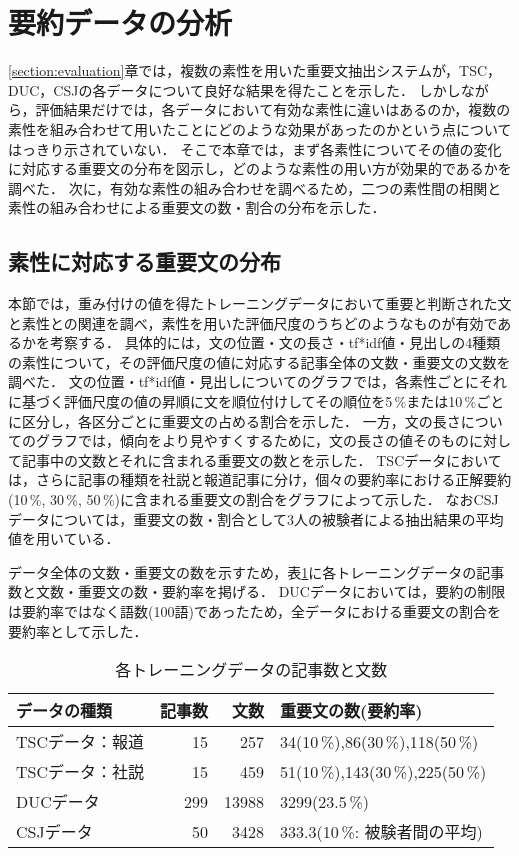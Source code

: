 \section{要約データの分析}
\label{section:analysis}

\ref{section:evaluation}章では，複数の素性を用いた重要文抽出システムが，TSC，DUC，CSJの各データについて良好な結果を得たことを示した．
しかしながら，評価結果だけでは，各データにおいて有効な素性に違いはあるのか，複数の素性を組み合わせて用いたことにどのような効果があったのかという点についてはっきり示されていない．
そこで本章では，まず各素性についてその値の変化に対応する重要文の分布を図示し，どのような素性の用い方が効果的であるかを調べた．
次に，有効な素性の組み合わせを調べるため，二つの素性間の相関と素性の組み合わせによる重要文の数・割合の分布を示した．

\subsection{素性に対応する重要文の分布}

本節では，重み付けの値を得たトレーニングデータにおいて重要と判断された文と素性との関連を調べ，素性を用いた評価尺度のうちどのようなものが有効であるかを考察する．
具体的には，文の位置・文の長さ・tf*idf値・見出しの4種類の素性について，その評価尺度の値に対応する記事全体の文数・重要文の文数を調べた．
文の位置・tf*idf値・見出しについてのグラフでは，各素性ごとにそれに基づく評価尺度の値の昇順に文を順位付けしてその順位を5\,\%または10\,\%ごとに区分し，各区分ごとに重要文の占める割合を示した．
一方，文の長さについてのグラフでは，傾向をより見やすくするために，文の長さの値そのものに対して記事中の文数とそれに含まれる重要文の数とを示した．
TSCデータにおいては，さらに記事の種類を社説と報道記事に分け，個々の要約率における正解要約(10\,\%, 30\,\%, 50\,\%)に含まれる重要文の割合をグラフによって示した．
なおCSJデータについては，重要文の数・割合として3人の被験者による抽出結果の平均値を用いている．

データ全体の文数・重要文の数を示すため，表\ref{table:training_num_of_sent}に各トレーニングデータの記事数と文数・重要文の数・要約率を掲げる．
DUCデータにおいては，要約の制限は要約率ではなく語数(100語)であったため，全データにおける重要文の割合を要約率として示した．

\begin{table}[t]
\caption{各トレーニングデータの記事数と文数}
\label{table:training_num_of_sent}
\begin{center}
\begin{tabular}{l|rrl} \hline
データの種類    & 記事数 & 文数  & 重要文の数(要約率) \\ \hline
TSCデータ：報道 & 15     & 257   & 34(10\,\%),86(30\,\%),118(50\,\%) \\       
TSCデータ：社説 & 15     & 459   & 51(10\,\%),143(30\,\%),225(50\,\%) \\
DUCデータ       & 299    & 13988 & 3299(23.5\,\%) \\       
CSJデータ       & 50     & 3428  & 333.3(10\,\%: 被験者間の平均) \\ \hline
\end{tabular}
\end{center}
\end{table}
\clearpage

